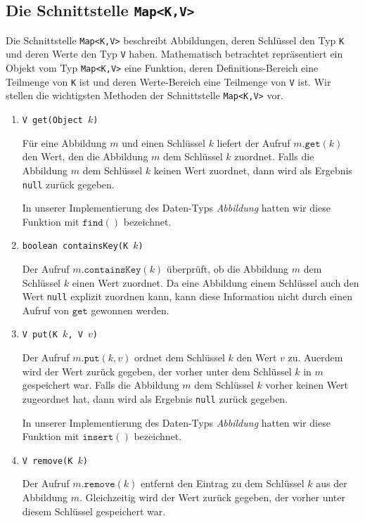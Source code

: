\subsection{Die Schnittstelle \texttt{Map<K,V>}}
Die Schnittstelle \texttt{Map<K,V>} beschreibt Abbildungen, deren Schl\"ussel den Typ
\texttt{K} und deren Werte den Typ \texttt{V} haben.  Mathematisch betrachtet
repr\"asentiert ein Objekt vom Typ \texttt{Map<K,V>} eine Funktion, deren
Definitions-Bereich eine Teilmenge von \texttt{K} ist und deren Werte-Bereich eine
Teilmenge von \texttt{V} ist.  Wir stellen die wichtigsten Methoden der Schnittstelle
\texttt{Map<K,V>} vor.
\begin{enumerate}
\item \texttt{V get(Object $k$)}
  
      F\"ur eine Abbildung $m$ und einen Schl\"ussel $k$ liefert der Aufruf
      $m.\mathtt{get}(k)$ den Wert, den die Abbildung $m$ dem Schl\"ussel $k$ zuordnet.
      Falls die Abbildung $m$ dem Schl\"ussel $k$ keinen Wert zuordnet, dann wird als
      Ergebnis \texttt{null} zur\"uck gegeben.

      In unserer Implementierung des Daten-Typs \emph{Abbildung} hatten wir diese Funktion
      mit $\texttt{find}()$ bezeichnet.
\item \texttt{boolean containsKey(K $k$)}

      Der Aufruf $m.\mathtt{containsKey}(k)$ \"uberpr\"uft, ob die Abbildung $m$ dem Schl\"ussel
      $k$ einen Wert zuordnet.  Da eine Abbildung einem Schl\"ussel auch den Wert
      \texttt{null} explizit zuordnen kann, kann diese Information nicht durch einen
      Aufruf von $\mathtt{get}$  gewonnen werden.
\item \texttt{V put(K $k$, V $v$)}

      Der Aufruf $m.\mathtt{put}(k,v)$ ordnet dem Schl\"ussel $k$ den Wert $v$ zu.
      Au\3erdem wird der Wert zur\"uck gegeben, der vorher unter dem Schl\"ussel $k$ in $m$
      gespeichert war.  Falls die Abbildung $m$ dem Schl\"ussel $k$ vorher keinen Wert
      zugeordnet hat, dann wird als Ergebnis \texttt{null} zur\"uck gegeben.

      In unserer Implementierung des Daten-Typs \emph{Abbildung} hatten wir diese Funktion
      mit $\texttt{insert}()$ bezeichnet.      
\item \texttt{V remove(K $k$)}
  
      Der Aufruf $m.\mathtt{remove}(k)$ entfernt den Eintrag zu dem Schl\"ussel $k$ aus der Abbildung
      $m$.  Gleichzeitig wird der Wert zur\"uck gegeben, der vorher unter diesem Schl\"ussel
      gespeichert war.
      

\end{enumerate}

